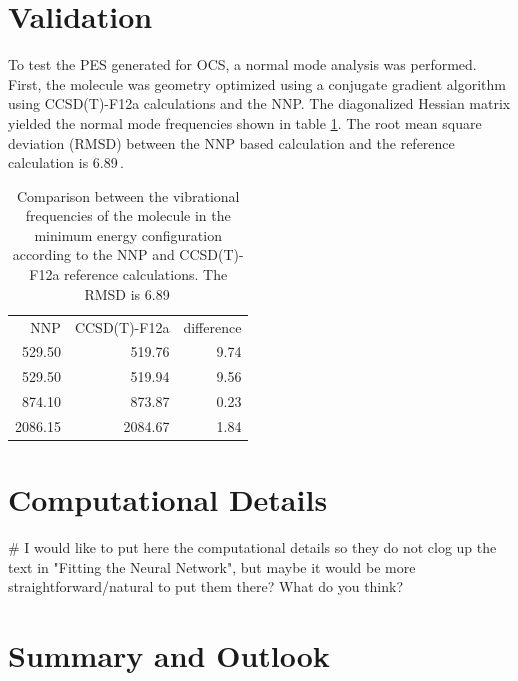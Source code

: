 \documentclass[12pt,titlepage]{article}
\begin{document}
\section{Validation}
\label{validation}
To test the PES generated for OCS, a normal mode analysis was performed. First, the molecule was geometry optimized using a conjugate gradient algorithm using CCSD(T)-F12a calculations and the NNP. The diagonalized Hessian matrix yielded the normal mode frequencies shown in table \ref{normal modes}. The root mean square deviation (RMSD) between the NNP based calculation and the reference calculation is 6.89\,\icm.


\begin{table}
	\label{normal modes}
	\caption{Comparison between the vibrational frequencies of the molecule in the minimum energy configuration according to the NNP and CCSD(T)-F12a reference calculations. The RMSD is 6.89\,\icm}	
	\begin{tabular}{r | r | r}


		NNP & CCSD(T)-F12a & difference\\

		529.50  & 519.76  & 9.74 \\
		529.50	& 519.94  & 9.56 \\
		874.10  & 873.87  & 0.23  \\
		2086.15 & 2084.67 & 1.84 \\
	\end{tabular}

\end{table}


\section{Computational Details}
\label{Computational Details}
\# I would like to put here the computational details so they do not clog up the text in "Fitting the Neural Network", but maybe it would be more straightforward/natural to put them there? What do you think?



\section{Summary and Outlook}
\label{summary}



\FloatBarrier


\end{document}
